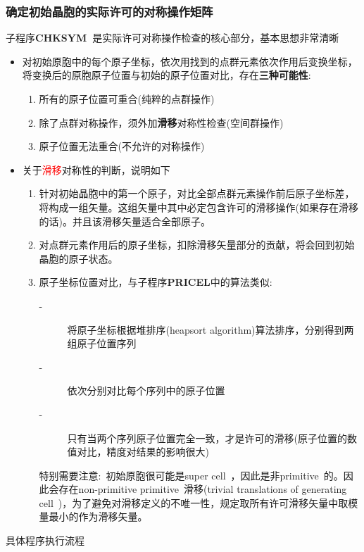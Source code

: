 \subsubsection{确定初始晶胞的实际许可的对称操作矩阵}
子程序\textbf{CHKSYM~}是实际许可对称操作检查的核心部分，基本思想非常清晰
\begin{itemize}
	\item 对初始原胞中的每个原子坐标，依次用找到的点群元素依次作用后变换坐标，将变换后的原胞原子位置与初始的原子位置对比，存在\textbf{三种可能性}:
\begin{enumerate}
	\item 所有的原子位置可重合(纯粹的点群操作)
	\item 除了点群对称操作，须外加\textbf{滑移}对称性检查(空间群操作)
	\item 原子位置无法重合(不允许的对称操作)
\end{enumerate}
	\item 关于\textcolor{red}{滑移}对称性的判断，说明如下
		\begin{enumerate}
			\item 针对初始晶胞中的第一个原子，对比全部点群元素操作前后原子坐标差，将构成一组矢量。这组矢量中其中必定包含许可的滑移操作(如果存在滑移的话)。并且该滑移矢量适合全部原子。
			\item 对点群元素作用后的原子坐标，扣除滑移矢量部分的贡献，将会回到初始晶胞的原子状态。
			\item 原子坐标位置对比，与子程序\textbf{PRICEL}中的算法类似:~
				\begin{description}
					\item[-] 将原子坐标根据堆排序\textrm{(heapsort algorithm)}算法排序，分别得到两组原子位置序列
					\item[-] 依次分别对比每个序列中的原子位置
					\item[-] 只有当两个序列原子位置完全一致，才是许可的滑移(原子位置的数值对比，精度对结果的影响很大)
				\end{description}
特别需要注意:~初始原胞很可能是\textrm{super cell~}，因此是非\textrm{primitive~}的。因此会存在\textrm{non-primitive primitive~}滑移(\textrm{trivial translations of generating cell~})，为了避免对滑移定义的不唯一性，规定取所有许可滑移矢量中取模量最小的作为滑移矢量。
		\end{enumerate}
\end{itemize}
具体程序执行流程
